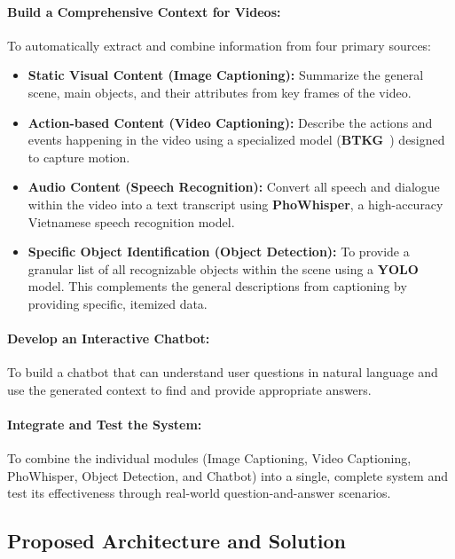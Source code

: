 \paragraph{Build a Comprehensive Context for Videos:} To automatically extract and combine information from four primary sources:

\begin{itemize}
    \item \textbf{Static Visual Content (Image Captioning):} Summarize the general scene, main objects, and their attributes from key frames of the video.
    
    \item \textbf{Action-based Content (Video Captioning):} Describe the actions and events happening in the video using a specialized model (\textbf{BTKG}~\cite{btkg}) designed to capture motion.
    
    \item \textbf{Audio Content (Speech Recognition):} Convert all speech and dialogue within the video into a text transcript using \textbf{PhoWhisper}, a high-accuracy Vietnamese speech recognition model.
    
    \item \textbf{Specific Object Identification (Object Detection):} To provide a granular list of all recognizable objects within the scene using a \textbf{YOLO} model. This complements the general descriptions from captioning by providing specific, itemized data.
\end{itemize}

\paragraph{Develop an Interactive Chatbot:} To build a chatbot that can understand user questions in natural language and use the generated context to find and provide appropriate answers.

\paragraph{Integrate and Test the System:} To combine the individual modules (Image Captioning, Video Captioning, PhoWhisper, Object Detection, and Chatbot) into a single, complete system and test its effectiveness through real-world question-and-answer scenarios.

\subsection{Proposed Architecture and Solution}

